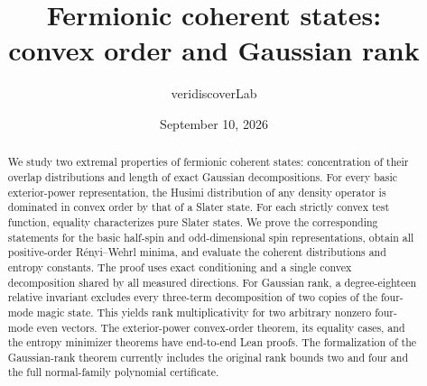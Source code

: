 \documentclass[11pt]{amsart}
\title[Fermionic coherent states]{Fermionic coherent states:\\convex order and Gaussian rank}
\author{veridiscoverLab}
\date{September 10, 2026}
\numberwithin{equation}{section}
\theoremstyle{definition}
\theoremstyle{remark}
\begin{document}
\begin{abstract}
We study two extremal properties of fermionic coherent states: concentration
of their overlap distributions and length of exact Gaussian decompositions.
For every basic exterior-power representation, the Husimi distribution of
any density operator is dominated in convex order by that of a Slater state.
For each strictly convex test function, equality characterizes pure Slater
states. We prove the corresponding statements for the basic half-spin and
odd-dimensional spin representations, obtain all positive-order
R\'enyi--Wehrl minima, and evaluate the coherent distributions and entropy
constants. The proof uses exact conditioning and a single convex
decomposition shared by all measured directions. For Gaussian rank, a
degree-eighteen relative invariant excludes every three-term decomposition
of two copies of the four-mode magic state. This yields rank multiplicativity
for two arbitrary nonzero four-mode even vectors. The exterior-power
convex-order theorem, its equality cases, and the entropy minimizer theorems
have end-to-end Lean proofs. The formalization of the Gaussian-rank theorem
currently includes the original rank bounds two and four and the full
normal-family polynomial certificate.
\end{abstract}
\maketitle








\end{document}
